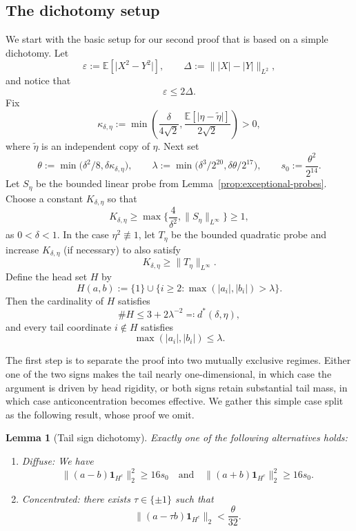 \documentclass[11pt]{amsart}
\numberwithin{equation}{section}
\newtheorem{lemma}[theorem]{Lemma}
\theoremstyle{definition}
\theoremstyle{remark}
\newcommand{\E}{\mathbb E}
\newcommand{\eps}{\varepsilon}
\newcommand{\abs}[1]{\lvert #1 \rvert}
\newcommand{\norm}[1]{\lVert #1 \rVert}
\begin{document}
\subsection{The dichotomy setup}

We start with the basic setup for our second proof that is based on a simple dichotomy. Let
\[
\eps:=\E[\abs{X^2-Y^2}],
\qquad
\Delta:=\norm{|X|-|Y|}_{L^2},
\]
and notice that
\[
\eps\le 2\Delta.
\]
Fix
\[
\kappa_{\delta,\eta}
:=
\min\left(
\frac{\delta}{4\sqrt2},
\frac{\E[\abs{\eta-\widetilde\eta}]}{2\sqrt2}
\right)>0,
\]
where $\widetilde\eta$ is an independent copy of $\eta$.  Next set
\[
\theta:=\min\bigl(\delta^2/8,\delta\kappa_{\delta,\eta}\bigr),
\qquad
\lambda:=\min\bigl(\delta^3/2^{20},\delta\theta/2^{17}\bigr),
\qquad
s_0:=\frac{\theta^2}{2^{14}}.
\]
Let $S_\eta$ be the bounded linear probe from
Lemma~\ref{prop:exceptional-probes}. Choose a
constant $K_{\delta,\eta}$ so that
\[
K_{\delta,\eta}\ge \max\bigg\{\frac{4}{\delta^2},\norm{S_\eta}_{L^\infty}\bigg\} \ge 1,
\]
as $0<\delta<1$. In the case $\eta^2\not\equiv1$, let
$T_\eta$ be the bounded quadratic probe and increase $K_{\delta,\eta}$ (if necessary) to also satisfy
\[
K_{\delta,\eta}\ge \norm{T_\eta}_{L^\infty}.
\]
Define the head set $H$ by
\[
H(a,b):=\{1\}\cup\{i\ge2:\max(|a_i|,|b_i|)>\lambda\}.
\]
Then the cardinality of $H$ satisfies
\[
\#H\le 3+2\lambda^{-2} \eqqcolon d^{\ast}(\delta,\eta),
\]
and every tail coordinate $i\notin H$ satisfies
\[
\max(|a_i|,|b_i|)\le \lambda.
\]

The first step is to separate the proof into two mutually exclusive regimes.
Either one of the two signs makes the tail nearly one-dimensional, in which
case the argument is driven by head rigidity, or both signs retain substantial
tail mass, in which case anticoncentration becomes effective. We gather this simple case split as the following result, whose proof we omit. 

\begin{lemma}[Tail sign dichotomy]\label{lem:dichotomy}
Exactly one of the following alternatives holds:
\begin{enumerate}[label=\rm(\roman*)]
\item \textit{Diffuse:} We have
\[
\norm{(a-b)\mathbf 1_{H^c}}_2^2\ge16s_0
\quad\text{and}\quad
\norm{(a+b)\mathbf 1_{H^c}}_2^2\ge16s_0.
\]
\item \textit{Concentrated:} there exists $\tau\in\{\pm1\}$ such that
\[
\norm{(a-\tau b)\mathbf 1_{H^c}}_2<\frac{\theta}{32}.
\]
\end{enumerate}
\end{lemma}
\end{document}

